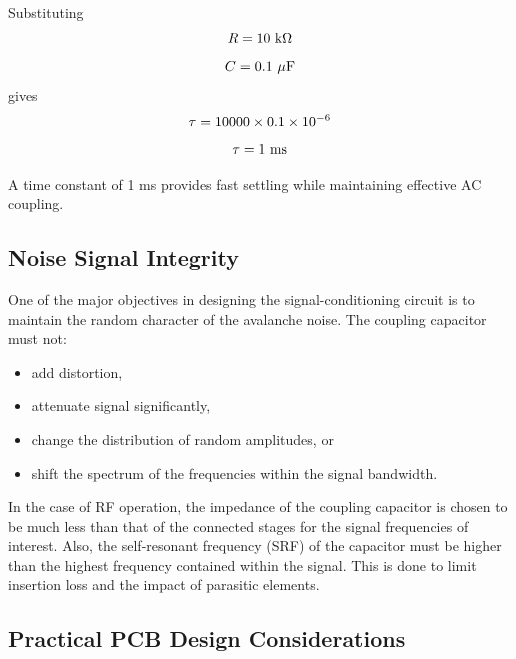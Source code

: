\documentclass[12pt,a4paper]{report}
\begin{document}
	Substituting
	\begingroup
	\setlength{\mathindent}{0pt}
	\begin{equation*}
		\hfill
		R = 10\ \text{k}\Omega
		\hfill
	\end{equation*}
	\endgroup
	\begingroup
	\setlength{\mathindent}{0pt}
	\begin{equation*}
		\hfill
		C = 0.1\ \mu\text{F}
		\hfill
	\end{equation*}
	\endgroup
	gives
	\begingroup
	\setlength{\mathindent}{0pt}
	\begin{equation*}
		\hfill
		\tau = 10000 \times 0.1 \times 10^{-6}
		\hfill
	\end{equation*}
	\endgroup
	\begingroup
	\setlength{\mathindent}{0pt}
	\begin{equation*}
		\hfill
		\tau = 1\ \text{ms}
		\hfill
	\end{equation*}
	\endgroup
	
	A time constant of 1 ms provides fast settling while maintaining effective AC coupling.
	
	\subsection{Noise Signal Integrity}
	
	One of the major objectives in designing the signal-conditioning circuit is to maintain the random character of the avalanche noise. The coupling capacitor must not:
	\begin{itemize}
		\item add distortion,
		\item attenuate signal significantly,
		\item change the distribution of random amplitudes, or
		\item shift the spectrum of the frequencies within the signal bandwidth.
	\end{itemize}
	In the case of RF operation, the impedance of the coupling capacitor is chosen to be much less than that of the connected stages for the signal frequencies of interest. Also, the self-resonant frequency (SRF) of the capacitor must be higher than the highest frequency contained within the signal. This is done to limit insertion loss and the impact of parasitic elements.
	
	\subsection{Practical PCB Design Considerations}
	
\end{document}
